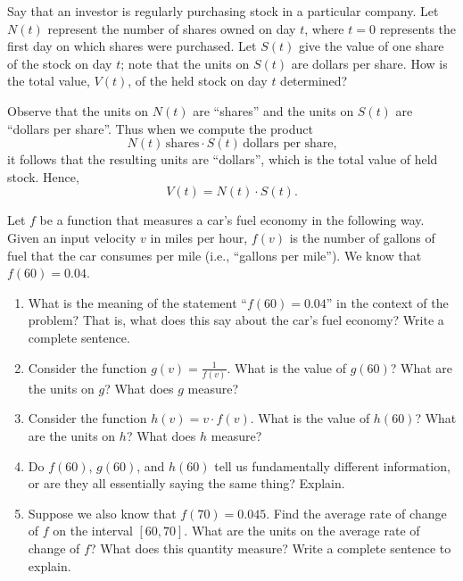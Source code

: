 \documentclass{ximera}
\begin{document}
	\begin{example}
		Say that an investor is regularly purchasing stock in a particular company. Let $N(t)$ represent the number of shares owned on day $t$,
		 where $t = 0$ represents the first day on which shares were purchased. Let $S(t)$ give the value of one share of the stock on day $t$; 
		 note that the units on $S(t)$ are dollars per share. How is the total value, $V(t)$, of the held stock on day $t$ determined?
		\begin{explanation}
			Observe that the units on $N(t)$ are ``shares'' and the units on $S(t)$ are ``dollars per share''.  Thus when we compute the product
			$$N(t) \, \text{shares}  \cdot S(t) \, \text{dollars per share}\text{,}$$
			it follows that the resulting units are ``dollars'', which is the total value of held stock.  Hence,
			$$V(t) = N(t) \cdot S(t)\text{.} $$
		\end{explanation}
	\end{example}



	\begin{exploration}
		Let $f$ be a function that measures a car's fuel economy in the following way. Given an input velocity $v$ in miles per hour, $f(v)$ is the number 
		of gallons of fuel that the car consumes per mile (i.e., ``gallons per mile''). We know that $f(60) = 0.04$.
		\begin{enumerate}
			\item What is the meaning of the statement ``$f(60) = 0.04$'' in the context of the problem? That is, what does this say about 
				the car's fuel economy? Write a complete sentence.
			\item Consider the function $g(v) = \frac{1}{f(v)}$. What is the value of $g(60)$? What are the units on $g$? What does $g$ measure? 
			\item Consider the function $h(v) = v \cdot f(v)$. What is the value of $h(60)$? What are the units on $h$? What does $h$ measure?
			\item Do $f(60)$, $g(60)$, and $h(60)$ tell us fundamentally different information, or are they all essentially saying the same thing?  Explain.
			\item Suppose we also know that $f(70) = 0.045$. Find the average rate of change of $f$ on the interval $[60,70]$. What are the units 
				on the average rate of change of $f$? What does this quantity measure? Write a complete sentence to explain.
		\end{enumerate}
	\end{exploration}	
	
\end{document}
